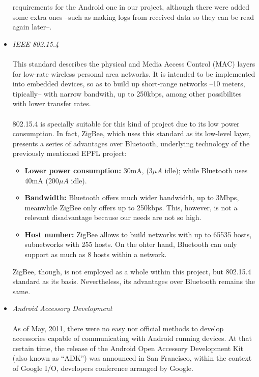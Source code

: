 \begin{itemize}
				requirements for the Android one in our project, although there were added some extra ones --such as
				making logs from received data so they can be read again later--.\\
			\item \emph{IEEE 802.15.4}\\\\
				This standard describes the physical and Media Access Control (MAC) layers for low-rate wireless
				personal area networks. It is intended to be implemented into embedded devices, so as to build up
				short-range networks --10 meters, tipically-- with narrow bandwith, up to 250kbps, among other
				possibilites with lower transfer rates.\\\\
				802.15.4 is specially suitable for this kind of project due to its low power consumption. In
				fact, ZigBee, which uses this standard as its low-level layer, presents a series of advantages
				over Bluetooth, underlying technology of the previously mentioned EPFL project:
				\begin{itemize}
					\item \textbf{Lower power consumption:} 30mA, ($3\mu A$ idle); while Bluetooth uses 40mA 
						($200\mu A$ idle).
					\item \textbf{Bandwidth:} Bluetooth offers much wider bandwidth, up to 3Mbps, meanwhile ZigBee 
						only offers up to 250kbps. This, however, is not a relevant disadvantage because our needs 
						are not so high.
					\item \textbf{Host number:} ZigBee allows to build networks with up to 65535 hosts, subnetworks 
						with 255 hosts. On the ohter hand, Bluetooth can only support as much as 8 hosts within a 
						network. 
				\end{itemize}
				ZigBee, though, is not employed as a whole within this project, but 802.15.4 standard as
				its basis. Nevertheless, its advantages over Bluetooth remains the same.\\
			\item \emph{Android Accessory Development}\\\\
				As of May, 2011, there were no easy nor official methods to develop
				accessories capable of communicating with Android running devices. At that
				certain time, the release of the Android Open Accessory Development Kit (also known as ``ADK'')
				was announced in San Francisco, within the context of Google I/O, developers
				conference arranged by Google.\\\\

\end{itemize}
